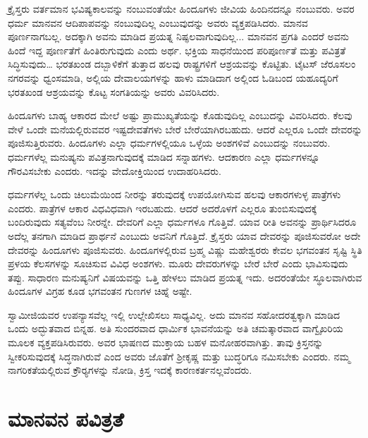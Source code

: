 \vskip 2pt

 ಕ್ರೈಸ್ತರು ವರ್ತಮಾನ ಭವಿಷ್ಯಕಾಲವನ್ನು ನಂಬುವಂತೆಯೇ ಹಿಂದೂಗಳು ಜೀವಿಯ ಹಿಂದಿನದನ್ನೂ ನಂಬುವರು. ಅವರ ಧರ್ಮ ಮಾನವನ ಆದಿಪಾಪವನ್ನು ನಂಬುವುದಿಲ್ಲ ಎಂಬುವುದನ್ನು ಅವರು ವ್ಯಕ್ತಪಡಿಸಿದರು. ಮಾನವ ಪೂರ್ಣನಾಗಬಲ್ಲ. ಅದಕ್ಕಾಗಿ ಅವನು ಮಾಡಿದ ಪ್ರಯತ್ನ ನಿಷ್ಫಲವಾಗುವುದಿಲ್ಲ... ಮಾನವನ ಪ್ರಗತಿ ಎಂದರೆ ಅವನು ಹಿಂದೆ ಇದ್ದ ಪೂರ್ಣತೆಗೆ ಹಿಂತಿರುಗುವುದು ಎಂದು ಅರ್ಥ. ಭಕ್ತಿಯ ಸಾಧನೆಯಿಂದ ಪರಿಪೂರ್ಣತೆ ಮತ್ತು ಪವಿತ್ರತೆ ಸಿದ್ಧಿಸುವುದು… ಭರತಖಂಡ ದಬ್ಬಾಳಿಕೆಗೆ ತುತ್ತಾದ ಹಲವು ರಾಷ್ಟ್ರಗಳಿಗೆ ಆಶ್ರಯವನ್ನು ಕೊಟ್ಟಿತು. ಟೈಟಸ್ ಜೆರೂಸಲಂ ನಗರವನ್ನು ಧ್ವಂಸಮಾಡಿ, ಅಲ್ಲಿಯ ದೇವಾಲಯಗಳನ್ನು ಹಾಳು ಮಾಡಿದಾಗ ಅಲ್ಲಿಂದ ಓಡಿಬಂದ ಯಹೂದ್ಯರಿಗೆ ಭರತಖಂಡ ಆಶ್ರಯವನ್ನು ಕೊಟ್ಟ ಸಂಗತಿಯನ್ನು ಅವರು ವಿವರಿಸಿದರು. 

\vskip 2pt

 ಹಿಂದೂಗಳು ಬಾಹ್ಯ ಆಕಾರದ ಮೇಲೆ ಅಷ್ಟು ಪ್ರಾಮುಖ್ಯತೆಯನ್ನು ಕೊಡುವುದಿಲ್ಲ ಎಂಬುದನ್ನು ವಿವರಿಸಿದರು. ಕೆಲವು ವೇಳೆ ಒಂದೇ ಮನೆಯಲ್ಲಿರುವವರ ಇಷ್ಟದೇವತೆಗಳು ಬೇರೆ ಬೇರೆಯಾಗಿರಬಹುದು. ಆದರೆ ಎಲ್ಲರೂ ಒಂದೇ ದೇವರನ್ನು ಪೂಜಿಸುತ್ತಿರುವರು. ಹಿಂದೂಗಳು ಎಲ್ಲಾ ಧರ್ಮಗಳಲ್ಲಿಯೂ ಒಳ್ಳೆಯ ಅಂಶಗಳಿವೆ ಎಂಬುದನ್ನು ನಂಬುವರು. ಧರ್ಮಗಳೆಲ್ಲ ಮನುಷ್ಯನು ಪವಿತ್ರನಾಗುವುದಕ್ಕೆ ಮಾಡಿದ ಸನ್ನಾಹಗಳು. ಆದಕಾರಣ ಎಲ್ಲಾ ಧರ್ಮಗಳನ್ನೂ ಗೌರವಿಸಬೇಕು ಎಂದರು. ಇದನ್ನು ವೇದೋಕ್ತಿಯಿಂದ ಉದಾಹರಿಸಿದರು. 

\vskip 2pt

 ಧರ್ಮಗಳೆಲ್ಲ ಒಂದು ಚಿಲುಮೆಯಿಂದ ನೀರನ್ನು ತರುವುದಕ್ಕೆ ಉಪಯೋಗಿಸುವ ಹಲವು ಆಕಾರಗಳುಳ್ಳ ಪಾತ್ರೆಗಳು ಎಂದರು. ಪಾತ್ರೆಗಳ ಆಕಾರ ವಿಧವಿಧವಾಗಿ ಇರಬಹುದು. ಆದರೆ ಅದರೊಳಗೆ ಎಲ್ಲರೂ ತುಂಬಿಸುವುದಕ್ಕೆ ಬಂದಿರುವುದು ಸತ್ಯವೆಂಬ ನೀರನ್ನೇ. ದೇವರಿಗೆ ಎಲ್ಲಾ ಧರ್ಮಗಳೂ ಗೊತ್ತಿವೆ. ಯಾವ ರೀತಿ ಅವನನ್ನು ಪ್ರಾರ್ಥಿಸಿದರೂ ಅದೆಲ್ಲ ತನಗಾಗಿ ಮಾಡಿದ ಪ್ರಾರ್ಥನೆ ಎಂಬುದು ಅವನಿಗೆ ಗೊತ್ತಿದೆ. ಕ್ರೈಸ್ತರು ಯಾವ ದೇವರನ್ನು ಪೂಜಿಸುವರೋ ಅದೇ ದೇವರನ್ನು ಹಿಂದೂಗಳು ಪೂಜಿಸುವರು. ಹಿಂದೂಗಳಲ್ಲಿರುವ ಬ್ರಹ್ಮ ವಿಷ್ಣು ಮಹೇಶ್ವರರು ಕೇವಲ ಭಗವಂತನ ಸೃಷ್ಟಿ ಸ್ಥಿತಿ ಪ್ರಳಯ ಕೆಲಸಗಳನ್ನು ಸೂಚಿಸುವ ವಿವಿಧ ಅಂಶಗಳು. ಮೂರು ದೇವರುಗಳನ್ನು ಬೇರೆ ಬೇರೆ ಎಂದು ಭಾವಿಸುವುದು ತಪ್ಪು. ಸಾಧಾರಣ ಮನುಷ್ಯನಿಗೆ ವಿಷಯವನ್ನು ಒತ್ತಿ ಹೇಳಲು ಮಾಡಿದ ಪ್ರಯತ್ನ ಇದು. ಅದರಂತೆಯೇ ಸ್ಥೂಲವಾಗಿರುವ ಹಿಂದೂಗಳ ವಿಗ್ರಹ ಕೂಡ ಭಗವಂತನ ಗುಣಗಳ ಚಿಹ್ನೆ ಅಷ್ಟೇ. 

\vskip 2pt

 ಸ್ವಾಮೀಜಿಯವರ ಉಪನ್ಯಾಸವೆಲ್ಲ ಇಲ್ಲಿ ಉಲ್ಲೇಖಿಸಲು ಸಾಧ್ಯವಿಲ್ಲ. ಅದು ಮಾನವ ಸಹೋದರತ್ವಕ್ಕಾಗಿ ಮಾಡಿದ ಒಂದು ಅದ್ಭುತವಾದ ಬಿನ್ನಹ. ಅತಿ ಸುಂದರವಾದ ಧಾರ್ಮಿಕ ಭಾವನೆಯನ್ನು ಅತಿ ಚಮತ್ಕಾರವಾದ ವಾಗ್ವೈಖರಿಯ ಮೂಲಕ ವ್ಯಕ್ತಪಡಿಸಿರುವರು. ಅವರ ಭಾಷಣದ ಮುಕ್ತಾಯ ಬಹಳ ಮನೋಹರವಾಗಿತ್ತು. ತಾವು ಕ್ರಿಸ್ತನನ್ನು ಸ್ವೀಕರಿಸುವುದಕ್ಕೆ ಸಿದ್ಧನಾಗಿರುವೆ ಎಂದ ಅವರು ಜೊತೆಗೆ ಶ‍್ರೀಕೃಷ್ಣ ಮತ್ತು ಬುದ್ಧರಿಗೂ ನಮಿಸಬೇಕು ಎಂದರು. ನಮ್ಮ ನಾಗರಿಕತೆಯಲ್ಲಿರುವ ಕ್ರೌರ‍್ಯಗಳನ್ನು ನೋಡಿ, ಕ್ರಿಸ್ತ ಇದಕ್ಕೆ ಕಾರಣಕರ್ತನಲ್ಲವೆಂದರು.


\section*{ಮಾನವನ ಪವಿತ್ರತೆ }

